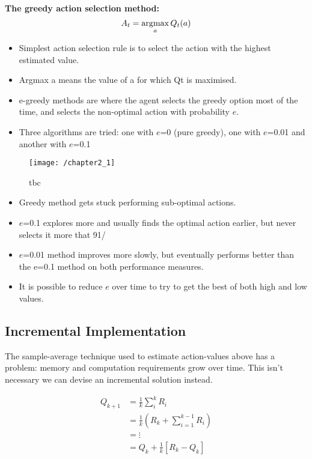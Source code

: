 \noindent \textbf{The greedy action selection method:}
\begin{equation} \label{eq: argmax}
A_t =\operatorname*{\arg\!\max}_a Q_t(a)
\end{equation}

\begin{itemize}
	\item Simplest action selection rule is to select the action with the highest estimated value.
	\item Argmax a means the value of a for which Qt is maximised.
	\item e-greedy methods are where the agent selects the greedy option most of the time, and selects the non-optimal action with probability \(e\).
	\item Three algorithms are tried: one with \(e\)=0 (pure greedy), one with \(e\)=0.01 and another with \(e\)=0.1
\end{itemize}

\begin{figure}[h!]
	\centering
	\texttt{[image: /chapter2\_1]}
	\caption{tbc}
	\label{fig:chapter2_1}
\end{figure}

\begin{itemize}
	\item Greedy method gets stuck performing sub-optimal actions.
	\item \(e\)=0.1 explores more and usually finds the optimal action earlier, but never selects it more that 91/%
	\item \(e\)=0.01 method improves more slowly, but eventually performs better than the e=0.1 method on both performance measures.
	\item It is possible to reduce \(e\) over time to try to get the best of both high and low values.
\end{itemize}

\subsection{Incremental Implementation}
The sample-average technique used to estimate action-values above has a problem: memory and computation requirements grow over time. This isn't necessary we can devise an incremental solution instead.

\begin{align}
	Q_{k+1} &= \frac{1}{k}\sum_{i}^{k}R_i \nonumber \\
	&= \frac{1}{k} \left( R_k + \sum_{i=1}^{k-1} R_i \right) \nonumber \\
	&= \vdots \\
	&= Q_k + \frac{1}{k} \left[R_k - Q_k\right]
\end{align}

